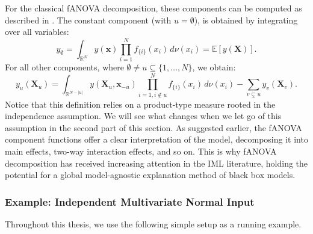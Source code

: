 For the classical fANOVA decomposition, these components can be computed as described in \cite{rahman2014}.
The constant component (with $u = \emptyset$), is obtained by integrating over all variables:
\begin{equation}
    y_{\emptyset} 
    = \int_{\mathbb{R}^N} 
        y(\boldsymbol{x}) 
        \prod_{i=1}^{N} f_{\{i\}}(x_i) 
        \, d\nu (x_i) 
    = \mathbb{E}[y(\boldsymbol{X})].
    \label{eq:intercept_classical}
\end{equation}
For all other components, where $\emptyset \neq u \subseteq \{1, \dots, N\}$, we obtain:
\begin{equation}
    y_u(\boldsymbol{X}_u) 
    = \int_{\mathbb{R}^{N- |u|}} 
        y(\boldsymbol{X}_u, \boldsymbol{x}_{-u}) 
        \prod_{i=1, i \notin u}^{N} f_{\{i\}}(x_i) 
        \, d\nu (x_i) 
      - \sum_{v \subsetneq u} y_v(\boldsymbol{X}_v).
    \label{eq:fanova_components_classical}
\end{equation}
Notice that this definition relies on a product-type measure rooted in the independence assumption. We will see what changes when we let go of this assumption in the second part of this section.
As suggested earlier, the fANOVA component functions offer a clear interpretation of the model, decomposing it into main effects, two-way interaction effects, and so on. This is why fANOVA decomposition has received increasing attention in the IML literature, holding the potential for a global model-agnostic explanation method of black box models.
\subsubsection{Example: Independent Multivariate Normal Input}

Throughout this thesis, we use the following simple setup as a running example.


